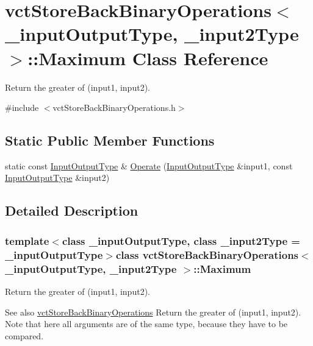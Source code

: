 \hypertarget{classvct_store_back_binary_operations_1_1_maximum}{}\section{vct\+Store\+Back\+Binary\+Operations$<$ \+\_\+input\+Output\+Type, \+\_\+input2\+Type $>$\+:\+:Maximum Class Reference}
\label{classvct_store_back_binary_operations_1_1_maximum}


Return the greater of (input1, input2).  




{\ttfamily \#include $<$vct\+Store\+Back\+Binary\+Operations.\+h$>$}

\subsection*{Static Public Member Functions}
\begin{DoxyCompactItemize}
\item 
static const \hyperlink{classvct_store_back_binary_operations_a9dc481d9e1345541dd5d833d5e5688f3}{Input\+Output\+Type} \& \hyperlink{classvct_store_back_binary_operations_1_1_maximum_ace06682e360419756669eb9d021569bb}{Operate} (\hyperlink{classvct_store_back_binary_operations_a9dc481d9e1345541dd5d833d5e5688f3}{Input\+Output\+Type} \&input1, const \hyperlink{classvct_store_back_binary_operations_a9dc481d9e1345541dd5d833d5e5688f3}{Input\+Output\+Type} \&input2)
\end{DoxyCompactItemize}


\subsection{Detailed Description}
\subsubsection*{template$<$class \+\_\+input\+Output\+Type, class \+\_\+input2\+Type = \+\_\+input\+Output\+Type$>$class vct\+Store\+Back\+Binary\+Operations$<$ \+\_\+input\+Output\+Type, \+\_\+input2\+Type $>$\+::\+Maximum}

Return the greater of (input1, input2). 

\begin{DoxySeeAlso}{See also}
\hyperlink{classvct_store_back_binary_operations}{vct\+Store\+Back\+Binary\+Operations} Return the greater of (input1, input2). Note that here all arguments are of the same type, because they have to be compared. 
\end{DoxySeeAlso}


